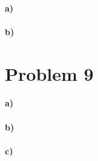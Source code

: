 \documentclass[12pt]{article}
\begin{document}
\paragraph{a)}

\paragraph{b)}

\section*{Problem 9}

\paragraph{a)}

\paragraph{b)}

\paragraph{c)}
\end{document}
